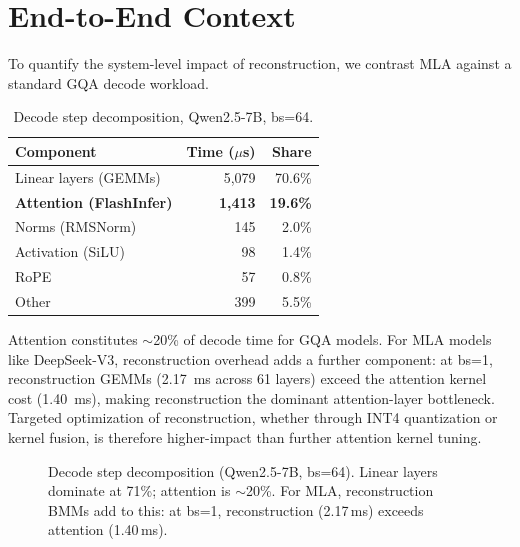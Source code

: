 \documentclass[10pt,twocolumn]{article}
\begin{document}
\section{End-to-End Context}
\label{sec:e2e}

To quantify the system-level impact of reconstruction, we contrast MLA against a standard GQA decode workload.

\begin{table}[h]
\centering
\small
\caption{Decode step decomposition, Qwen2.5-7B, bs=64.}
\label{tab:e2e}
\begin{tabular}{@{}lrr@{}}
\toprule
Component & Time ($\mu$s) & Share \\
\midrule
Linear layers (GEMMs) & 5,079 & 70.6\% \\
\textbf{Attention (FlashInfer)} & \textbf{1,413} & \textbf{19.6\%} \\
Norms (RMSNorm) & 145 & 2.0\% \\
Activation (SiLU) & 98 & 1.4\% \\
RoPE & 57 & 0.8\% \\
Other & 399 & 5.5\% \\
\bottomrule
\end{tabular}
\end{table}

Attention constitutes $\sim$20\% of decode time for GQA models.  For MLA models like DeepSeek-V3, reconstruction overhead adds a further component: at bs=1, reconstruction GEMMs (2.17~ms across 61 layers) exceed the attention kernel cost (1.40~ms), making reconstruction the dominant attention-layer bottleneck.  Targeted optimization of reconstruction, whether through INT4 quantization or kernel fusion, is therefore higher-impact than further attention kernel tuning.

\begin{figure}[t]
\centering
{}
\caption{Decode step decomposition (Qwen2.5-7B, bs=64).  Linear layers dominate at 71\%; attention is ${\sim}$20\%.  For MLA, reconstruction BMMs add to this: at bs=1, reconstruction (2.17\,ms) exceeds attention (1.40\,ms).}
\label{fig:e2e}
\end{figure}
\end{document}
